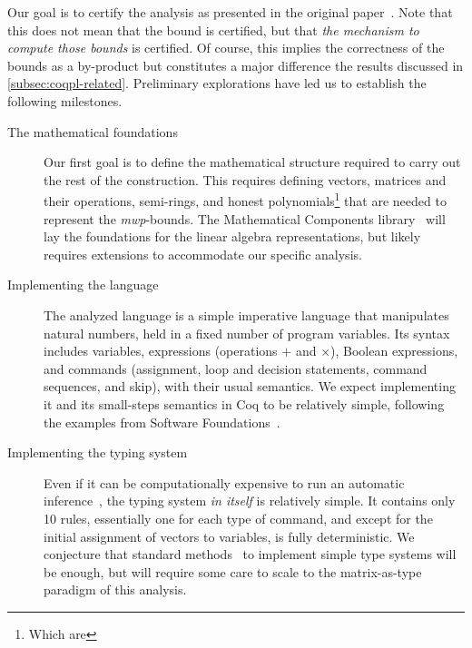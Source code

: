 Our goal is to certify the analysis as presented in {the original paper}~\cite{jones2009}.
Note that this does not mean that the bound is certified, but that \emph{the mechanism to compute those bounds} is certified.
Of course, this implies the correctness of the bounds as a by-product but constitutes a major difference \wrt the results discussed in \autoref{subsec:coqpl-related}.
Preliminary explorations have led us to establish the following milestones.

\begin{description}
    \item[The mathematical foundations]
    Our first goal is to define the mathematical structure required to carry out the rest of the construction.
    This requires defining vectors, matrices and their operations, semi-rings, and honest polynomials\footnote{%
        Which are } that are needed to represent the \emph{mwp}-bounds.
    The Mathematical Components library~\cite{mahboubi2022,mathcomp} will lay the foundations for the linear algebra representations, but likely requires extensions to accommodate our specific analysis.

    \item[Implementing the language]
    The analyzed language is a simple imperative language that manipulates natural numbers, held in a fixed number of program variables.
    Its syntax includes variables, expressions (operations \(+\) and \(\times\)), Boolean expressions, and commands
    (\eg  assignment, loop and decision statements, command sequences, and skip), with their usual semantics.
    We expect implementing it and its small-steps semantics in Coq to be relatively simple, following the examples from Software Foundations~\cite{cpierce20221,cpierce20222}.

    \item[Implementing the typing system]
    Even if it can be computationally expensive to run an automatic inference~\cite{aubert2023b}, the typing system \emph{in itself} is relatively simple.
    It contains only 10 rules, essentially one for each type of command, and except for the initial assignment of vectors to variables, is fully deterministic.
    We conjecture that standard methods~\cite{chlipala2022, chlipala2010} to implement simple type systems will be enough, but will require some care to scale to the matrix-as-type paradigm of this analysis.


\end{description}
